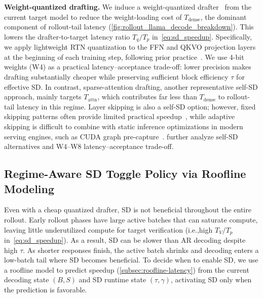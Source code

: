 \documentclass{llmxive}
\providecommand{\ie}{i.e.,\xspace}
\providecommand{\DrafterDist}{q}
\providecommand{\TargetDist}{p}
\providecommand{\TargetTime}{T_\TargetDist}
\providecommand{\DraftTime}{T_\DrafterDist}
\providecommand{\VerifyTime}{T_V}
\providecommand{\mal}{\tau}
\providecommand{\Tdense}{T_{\mathrm{dense}}}
\providecommand{\Tattn}{T_{\mathrm{attn}}}
\begin{document}
\textbf{Weight-quantized drafting.}
We induce a weight-quantized drafter~\citep{tiwari2025quantspec} from the current target model to reduce the weight-loading cost of $\Tdense$, the dominant component of rollout-tail latency (\cref{fig:rollout_llama_decode_breakdown}).
This lowers the drafter-to-target latency ratio $\DraftTime/\TargetTime$ in~\cref{eq:sd_speedup}.
Specifically, we apply lightweight RTN quantization to the FFN and QKVO projection layers at the beginning of each training step, following prior practice~\citep{lin2024awq}.
We use 4-bit weights (W4) as a practical latency--acceptance trade-off: lower precision makes drafting substantially cheaper while preserving sufficient block efficiency $\mal$ for effective SD.
In contrast, sparse-attention drafting, another representative self-SD approach, mainly targets $\Tattn$, which contributes far less than $\Tdense$ to rollout-tail latency in this regime.
Layer skipping is also a self-SD option; however, fixed skipping patterns often provide limited practical speedup~\citep{xia2024unlocking,song2026knn}, while adaptive skipping is difficult to combine with static inference optimizations in modern serving engines, such as CUDA graph pre-capture~\citep{xia2024swift,chen2025clasp,kwon2023efficient}.
 further analyze self-SD alternatives and W4--W8 latency--acceptance trade-off.


\subsection{Regime-Aware SD Toggle Policy via Roofline Modeling}
\label{subsec:sd-toggle}

Even with a cheap quantized drafter, SD is not beneficial throughout the entire rollout.
Early rollout phases have large active batches that can saturate compute, leaving little underutilized compute for target verification (\ie{}high $\VerifyTime/\TargetTime$ in~\cref{eq:sd_speedup}). As a result, SD can be slower than AR decoding despite high $\mal$.
As shorter responses finish, the active batch shrinks and decoding enters a low-batch tail where SD becomes beneficial.
To decide when to enable SD, we use a roofline model to predict speedup (\cref{subsec:roofline-latency}) from the current decoding state $(B,S)$ and SD runtime state $(\mal,\gamma)$, activating SD only when the prediction is favorable.
\end{document}
